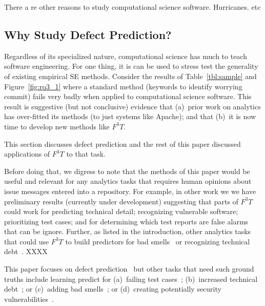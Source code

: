 \documentclass[10pt,conference]{IEEEtran}
\newcommand{\fig}[1]{Figure~\ref{fig:#1}}
\newcommand{\tbl}[1]{Table~\ref{tbl:#1}}
\begin{document}
There a re other reasons to study computational science software. Hurricanes. etc


\subsection{Why Study Defect Prediction?}


Regardless of its specialized nature, 
computational science has much to teach software engineering.
For one thing, it is can be used to 
 stress test
the generality of  existing empirical SE methods.
Consider the results of \tbl{sample} and \fig{rq3_1} where  a standard method  (keywords to identify worrying commit) fails very badly
when applied to computational science software.
This result is suggestive (but not conclusive) evidence that (a)~prior work on analytics has over-fitted
its methods (to just systems like Apache);  and that (b)~it is 
now time to develop new methods like $F^3T$.

This section discusses defect prediction and  the rest of this paper discussed applications of $F^3T$ to that task.

Before doing that, we digress to note that the methods of  this paper would be useful and relevant for any analytics
tasks that requires human opinions about issue messages entered into a repository.
For example, in other work we we have preliminary
results (currently under development)
suggesting that parts of $F^3T$   could  work for  predicting technical detail;
recognizing vulnerable software; prioritizing test cases;
and for determining which test reports are false alarms that can be ignore.
Further, as listed in the introduction,
other analytics tasks that could use $F^3T$ to build predictors for 
bad smells~\cite{KRISHNA201753} or recognizing
technical debt~\cite{huang2018identifying}. XXXX

This paper focuses on defect prediction~\cite{menzies07dp}
but other tasks that need such ground truths include learning  
predict for (a)~failing test cases~\cite{zhu2018test}; (b)~increased
technical debt~\cite{huang2018identifying};   or
(c)~adding bad smells~\cite{KRISHNA201753}; or (d)~creating  potentially security vulnerabilities~\cite{yu18v}.
\end{document}
